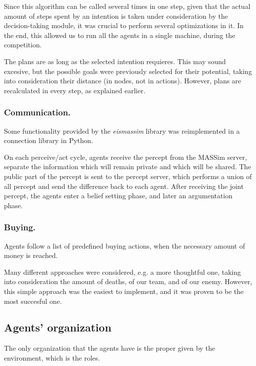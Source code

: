 \documentclass{llncs2e/llncs}
\begin{document}
    Since this algorithm can be called several times in one step, given that the 
    actual amount of steps spent by an intention is taken under consideration by 
    the decision-taking module, it was crucial to perform several optimizations in 
    it. In the end, this allowed us to run all the agents in a single machine, 
    during the competition.
    
    The plans are as long as the selected intention requieres. This may 
    sound excesive, but the possible goals were previously selected for their 
    potential, taking into consideration their distance (in nodes, not in 
    actions). However, plans are recalculated in every step, as explained earlier.

    
\subsubsection{Communication.}

    Some functionality provided by the \textit{eismassim} library was
    reimplemented in a connection library in Python.

    On each perceive/act cycle, agents receive the percept from the MASSim server, 
    separate the information which will remain private and which will be shared. 
    The public part of the percept is sent to the percept server, which performs a 
    union of all percept and send the difference back to each agent. After 
    receiving the joint percept, the agents enter a belief setting phase, and 
    later an argumentation phase.
    
\subsubsection{Buying.}

    Agents follow a list of predefined buying actions, when the necessary amount 
    of money is reached.
    
    Many different approaches were considered, e.g. a more thoughtful one, taking
    into consideration the amount of deaths, of our team, and of our enemy.
    However, this simple approach was the easiest to implement, and it was
    proven to be the most succesful one.

    
\subsection{Agents' organization}

    The only organization that the agents have is the proper given by the 
    environment, which is the roles. 
    
\end{document}
